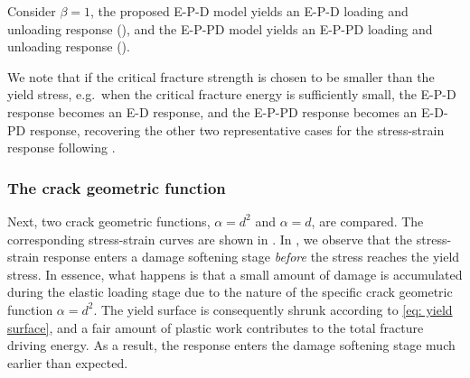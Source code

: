 Consider $\beta = 1$, the proposed E-P-D model yields an E-P-D loading and unloading response (), and the E-P-PD model yields an E-P-PD loading and unloading response ().



We note that if the critical fracture strength is chosen to be smaller than the yield stress, e.g.\  when the critical fracture energy is sufficiently small, the E-P-D response becomes an E-D response, and the E-P-PD response becomes an E-D-PD response, recovering the other two representative cases for the stress-strain response following \citet{alessi_coupling_2018}.

\subsubsection{The crack geometric function}
\label{section: Chapter5/verification/homogenized/alpha}

Next, two crack geometric functions, $\alpha = d^2$ and $\alpha = d$, are compared. The corresponding stress-strain curves are shown in .
In , we observe that  the stress-strain response enters a damage softening stage \textit{before} the stress reaches the yield stress. In essence, what happens is that a small amount of damage is accumulated during the elastic loading stage due to the nature of the specific crack geometric function $\alpha = d^2$.
The yield surface is consequently shrunk according to \eqref{eq: yield surface}, and a fair amount of plastic work contributes to the total fracture driving energy. As a result, the response enters the damage softening stage much earlier than expected.


